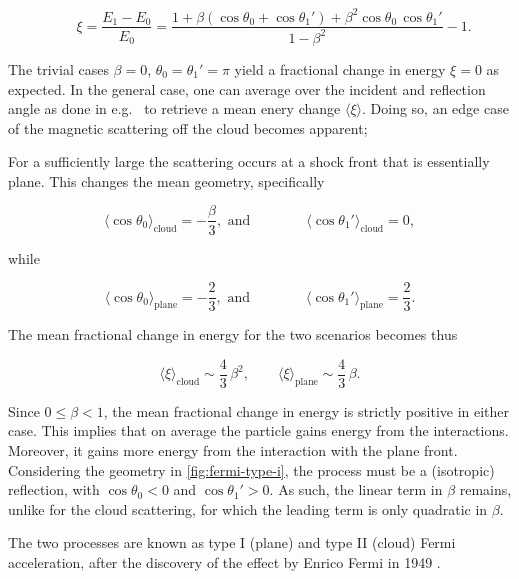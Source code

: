 \begin{equation}
\label{eq:fractional-energy-change}
\qquad\xi = \frac{E_1 - E_0}{E_0} = \frac{1 
	+ \beta\left(\cos\theta_0 + \cos\theta_1'\right) 
	+ \beta^2 \cos\theta_0\,\cos\theta_1'}{1-\beta^2} - 1. 
\end{equation}

The trivial cases $\beta=0$, $\theta_0 = \theta_1'=\pi$ yield a fractional 
change in energy $\xi=0$ as expected. In the general case, one can average over
the incident and reflection angle as done in e.g.\ 
\cite{gaisserCosmicRaysParticle2016} to retrieve a mean enery change 
$\langle\xi\rangle$. Doing so, an edge case of the magnetic scattering off the 
cloud becomes apparent;

For a sufficiently large \SNR the scattering occurs at a shock front that is
essentially plane. This changes the mean geometry, specifically

\begin{equation}
	\langle\cos\theta_0\rangle_\mathrm{cloud} = -\frac{\beta}{3}, 
	\,\,\mathrm{and}\qquad\qquad 
	\langle\cos\theta_1'\rangle_\mathrm{cloud} = 0,
\end{equation}

while

\begin{equation}
	\langle\cos\theta_0\rangle_\mathrm{plane} = -\frac{2}{3},
	\,\,\mathrm{and}\qquad\qquad 
	\langle\cos\theta_1'\rangle_\mathrm{plane} = \frac{2}{3}.
\end{equation}

The mean fractional change in energy for the two scenarios becomes thus

\begin{equation}
	\label{eq:fermi-energy-gain}
	\langle\xi\rangle_\mathrm{cloud} \sim \frac{4}{3}\,\beta^2, 
	\qquad 
	\langle\xi\rangle_\mathrm{plane} \sim \frac{4}{3}\,\beta.
\end{equation}

Since $0\leq\beta<1$, the mean fractional change in energy is strictly positive
in either case. This implies that on average the particle gains energy from the
interactions. Moreover, it gains more energy from the interaction with the 
plane front. Considering the geometry in \cref{fig:fermi-type-i}, the process 
must be a (isotropic) reflection, with $\cos\theta_0<0$ and $\cos\theta_1'>0$. 
As such, the linear term in $\beta$ remains, unlike for the cloud scattering, 
for which the leading term is only quadratic in $\beta$.

The two processes are known as type I (plane) and type II (cloud) Fermi
acceleration, after the discovery of the effect by Enrico Fermi in 1949
\cite{fermiOriginCosmicRadiation1949}.

